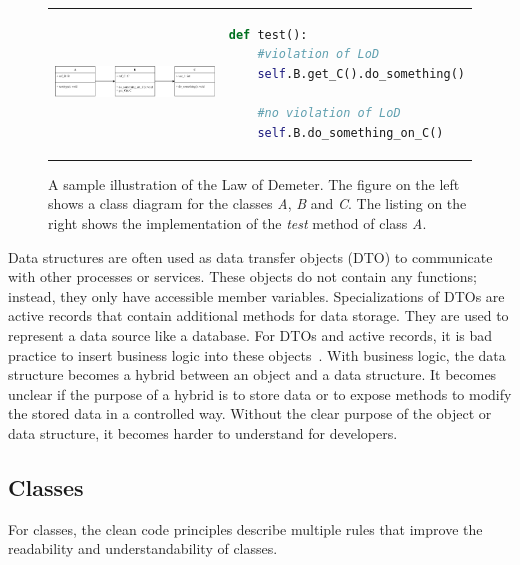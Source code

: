 \begin{figure}
\begin{tabular}{p{}p{}}
    \begin{minipage}{0.45\textwidth}
        \centering
    \includegraphics[width=\linewidth]{img/Background/LawOfDemeterUML.pdf}
    \label{fig:background_control_flow_graph_image}
    \end{minipage}
&
\begin{minipage}[c]{0.45\textwidth}
\centering
\begin{lstlisting}[language=Python, label=lst:background_control_flow_graph_listing]
def test():
    #violation of LoD
    self.B.get_C().do_something()

    #no violation of LoD
    self.B.do_something_on_C()
\end{lstlisting}
\end{minipage}
\end{tabular}
\caption{A sample illustration of the Law of Demeter. The figure on the left shows a class diagram for the classes \textit{A}, \textit{B} and \textit{C}. The listing on the right shows the implementation of the \textit{test} method of class \textit{A}. }
\label{fig:LoD}
\end{figure}



Data structures are often used as data transfer objects (DTO) to communicate with other processes or services. These objects do not contain any functions; instead, they only have accessible member variables. Specializations of DTOs are active records that contain additional methods for data storage. They are used to represent a data source like a database. For DTOs and active records, it is bad practice to insert business logic into these objects~\cite{martin_clean_2009}. With business logic, the data structure becomes a hybrid between an object and a data structure. It becomes unclear if the purpose of a hybrid is to store data or to expose methods to modify the stored data in a controlled way. Without the clear purpose of the object or data structure, it becomes harder to understand for developers.


\subsection{Classes}\label{sec:classes}
For classes, the clean code principles describe multiple rules that improve the readability and understandability of classes.

